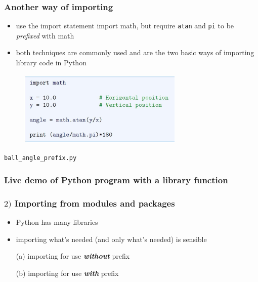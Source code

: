 \documentclass[14pt]{beamer}
\newcommand\red[1]{{\color{red} #1}}
\begin{document}

\begin{frame}[fragile]
\frametitle{Another way of importing}

\begin{itemize}
	\item use the import statement import math, but require \texttt{atan} and \texttt{pi} to be \red{\emph{prefixed}} with math
	\item both techniques are commonly used and are the two basic ways of importing library code in Python
\end{itemize}
\begin{figure}[ht]
	\centering
	\includegraphics[width=0.7\textwidth]{figures/LLp14}
\end{figure}
\vspace*{-5mm}
\begin{center}
	\texttt{ball\_angle\_prefix.py}
\end{center}

\end{frame}


\begin{frame}[fragile]
\frametitle{Live demo of Python program with a library function}

\end{frame}


\begin{frame}[fragile]

\frametitle{$2)$ Importing from modules and packages}

\begin{itemize}
	\item Python has many libraries
	\item importing what's needed (and only what's needed) is sensible
\end{itemize}

\begin{itemize}
	\item[(a)] importing for use \textbf{\emph{without}} prefix %

	\item[]

	\item[(b)] importing for use \textbf{\emph{with}} prefix %
\end{itemize}

\end{frame}
\end{document}
